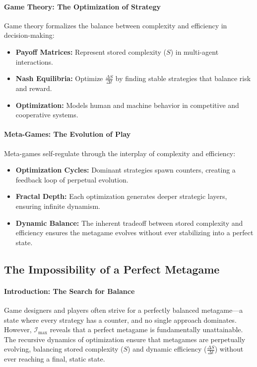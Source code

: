 \documentclass[12pt]{article}
\begin{document}
\paragraph{Game Theory: The Optimization of Strategy}
Game theory formalizes the balance between complexity and efficiency in decision-making:
\begin{itemize}
    \item \textbf{Payoff Matrices:} Represent stored complexity (\(S\)) in multi-agent interactions.
    \item \textbf{Nash Equilibria:} Optimize \(\frac{\Delta S}{\Delta t}\) by finding stable strategies that balance risk and reward.
    \item \textbf{Optimization:} Models human and machine behavior in competitive and cooperative systems.
\end{itemize}

\paragraph{Meta-Games: The Evolution of Play}
Meta-games self-regulate through the interplay of complexity and efficiency:
\begin{itemize}
    \item \textbf{Optimization Cycles:} Dominant strategies spawn counters, creating a feedback loop of perpetual evolution.
    \item \textbf{Fractal Depth:} Each optimization generates deeper strategic layers, ensuring infinite dynamism.
    \item \textbf{Dynamic Balance:} The inherent tradeoff between stored complexity and efficiency ensures the metagame evolves without ever stabilizing into a perfect state.
\end{itemize}

\subsection{The Impossibility of a Perfect Metagame}

\paragraph{Introduction: The Search for Balance}
Game designers and players often strive for a perfectly balanced metagame—a state where every strategy has a counter, and no single approach dominates. However, \(\mathcal{I}_{\text{max}}\) reveals that a perfect metagame is fundamentally unattainable. The recursive dynamics of optimization ensure that metagames are perpetually evolving, balancing stored complexity (\(S\)) and dynamic efficiency (\(\frac{\Delta S}{\Delta t}\)) without ever reaching a final, static state.
\end{document}

